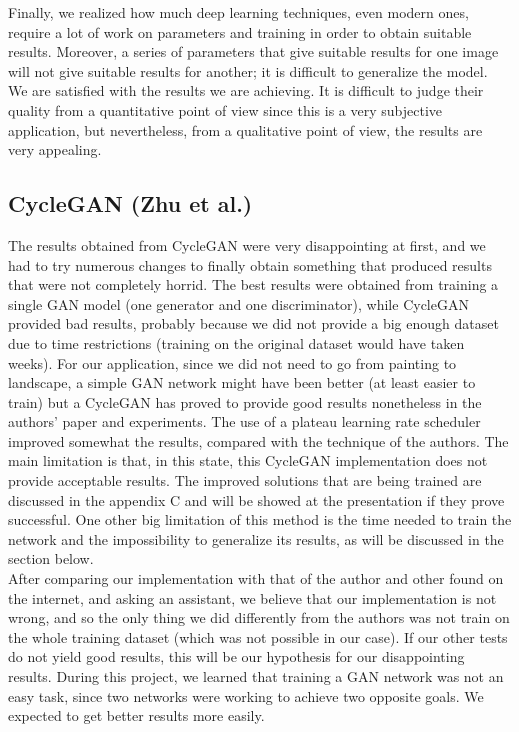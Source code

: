 \documentclass[twocolumn,superscriptaddress,aps,floatfix, nofootinbib]{revtex4-1}
\begin{document}
    Finally, we realized how much deep learning techniques, even modern ones, require a lot of work on parameters and training in order to obtain suitable results. Moreover, a series of parameters that give suitable results for one image will not give suitable results for another; it is difficult to generalize the model.\\
    
    We are satisfied with the results we are achieving. It is difficult to judge their quality from a quantitative point of view since this is a very subjective application, but nevertheless, from a qualitative point of view, the results are very appealing.
    
    \subsection{CycleGAN (Zhu et al.)}
    
    The results obtained from CycleGAN were very disappointing at first, and we had to try numerous changes to finally obtain something that produced results that were not completely horrid. The best results were obtained from training a single GAN model (one generator and one discriminator), while CycleGAN provided bad results, probably because we did not provide a big enough dataset due to time restrictions (training on the original dataset would have taken weeks). For our application, since we did not need to go from painting to landscape, a simple GAN network might have been better (at least easier to train) but a CycleGAN has proved to provide good results nonetheless in the authors' paper and experiments. The use of a plateau learning rate scheduler improved somewhat the results, compared with the technique of the authors. The main limitation is that, in this state, this CycleGAN implementation does not provide acceptable results. The improved solutions that are being trained are discussed in the appendix C and will be showed at the presentation if they prove successful. One other big limitation of this method is the time needed to train the network and the impossibility to generalize its results, as will be discussed in the section below.\\
    
    After comparing our implementation with that of the author and other found on the internet, and asking an assistant, we believe that our implementation is not wrong, and so the only thing we did differently from the authors was not train on the whole training dataset (which was not possible in our case). If our other tests do not yield good results, this will be our hypothesis for our disappointing results. During this project, we learned that training a GAN network was not an easy task, since two networks were working to achieve two opposite goals. We expected to get better results more easily.
    
\end{document}
